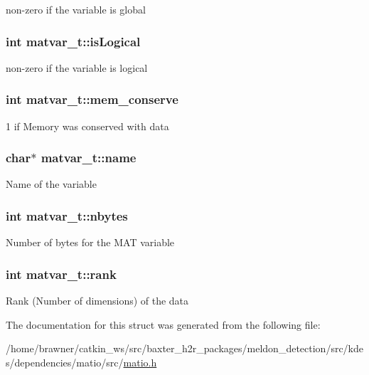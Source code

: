 non-\/zero if the variable is global \hypertarget{structmatvar__t_a866c1539e68073a837833d74cd4a65be}{
\subsubsection[{is\-Logical}]{\setlength{\rightskip}{0pt plus 5cm}int matvar\-\_\-t\-::is\-Logical}}\label{structmatvar__t_a866c1539e68073a837833d74cd4a65be}
non-\/zero if the variable is logical \hypertarget{structmatvar__t_aff20e87a00691c97340ab07656a13ee7}{
\subsubsection[{mem\-\_\-conserve}]{\setlength{\rightskip}{0pt plus 5cm}int matvar\-\_\-t\-::mem\-\_\-conserve}}\label{structmatvar__t_aff20e87a00691c97340ab07656a13ee7}
1 if Memory was conserved with data \hypertarget{structmatvar__t_a5f03073a500dae5824d0c7895ae60df9}{
\subsubsection[{name}]{\setlength{\rightskip}{0pt plus 5cm}char$\ast$ matvar\-\_\-t\-::name}}\label{structmatvar__t_a5f03073a500dae5824d0c7895ae60df9}
Name of the variable \hypertarget{structmatvar__t_ae6e0987fef1e35a7e4d0a78b27648035}{
\subsubsection[{nbytes}]{\setlength{\rightskip}{0pt plus 5cm}int matvar\-\_\-t\-::nbytes}}\label{structmatvar__t_ae6e0987fef1e35a7e4d0a78b27648035}
Number of bytes for the M\-A\-T variable \hypertarget{structmatvar__t_a84ba70c96ded13cc555fa75b768d9921}{
\subsubsection[{rank}]{\setlength{\rightskip}{0pt plus 5cm}int matvar\-\_\-t\-::rank}}\label{structmatvar__t_a84ba70c96ded13cc555fa75b768d9921}
Rank (Number of dimensions) of the data 

The documentation for this struct was generated from the following file\-:\begin{DoxyCompactItemize}
\item 
/home/brawner/catkin\-\_\-ws/src/baxter\-\_\-h2r\-\_\-packages/meldon\-\_\-detection/src/kdes/dependencies/matio/src/\hyperlink{matio_8h}{matio.\-h}\end{DoxyCompactItemize}
